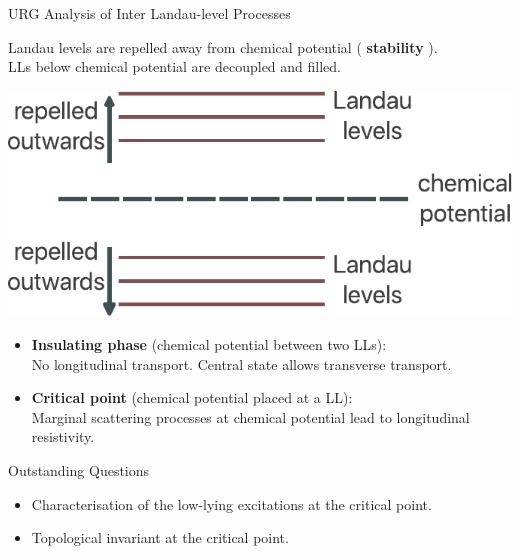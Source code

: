 \documentclass[12pt,aspectratio=169]{beamer}
\newcommand\focus[1]{%
	{\alert{\textbf{#1}}}
}
\begin{document}
\begin{frame}{URG Analysis of Inter Landau-level Processes}
\begin{minipage}{0.45\textwidth}
	Landau levels are repelled away from chemical potential (\focus{stability}).\\[10pt]

LLs below chemical potential are decoupled and filled. 
\end{minipage}
\hspace*{\fill}
\begin{minipage}{0.45\textwidth}
	\includegraphics[width=\textwidth]{interLL.pdf}
\end{minipage}

\vspace{\fill}
\begin{itemize}
	\item \focus{Insulating phase} (chemical potential between two LLs):\\
No longitudinal transport. Central state allows transverse transport.
	\item \focus{Critical point} (chemical potential placed at a LL):\\
Marginal scattering processes at chemical potential lead to longitudinal resistivity.
\end{itemize}
\end{frame}

\begin{frame}{Outstanding Questions}
	\begin{itemize}
		\item Characterisation of the low-lying excitations at the critical point.\\[10pt]
		\item Topological invariant at the critical point. \\[10pt]
	\end{itemize}
\end{frame}
\end{document}
